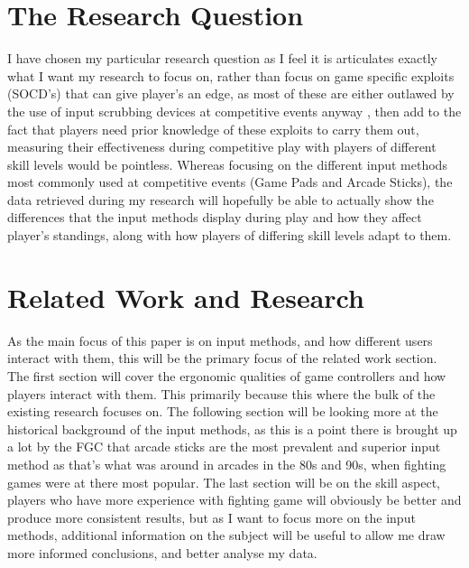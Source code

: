 \documentclass[journal]{IEEEtran}
\begin{document}
\section{The Research Question}
I have chosen my particular research question as I feel it is articulates exactly what I want my research to focus on, rather than focus on game specific exploits (SOCD's) that can give player's an edge, as most of these are either outlawed by the use of input scrubbing devices at competitive events anyway \cite{socdinput}, then add to the fact that players need prior knowledge of these exploits to carry them out, measuring their effectiveness during competitive play with players of different skill levels would be pointless. Whereas focusing on the different input methods most commonly used at competitive events (Game Pads and Arcade Sticks), the data retrieved during my research will hopefully be able to actually show the differences that the input methods display during play and how they affect player's standings, along with how players of differing skill levels adapt to them. 

\section{Related Work and Research}
As the main focus of this paper is on input methods, and how different users interact with them, this will be the primary focus of the related work section. The first section will cover the ergonomic qualities of game controllers and how players interact with them. This primarily because this where the bulk of the existing research focuses on. The following section will be looking more at the historical background of the input methods, as this is a point there is brought up a lot by the FGC that arcade sticks are the most prevalent and superior input method as that's what was around in arcades in the 80s and 90s, when fighting games were at there most popular. The last section will be on the skill aspect, players who have more experience with fighting game will obviously be better and produce more consistent results, but as I want to focus more on the input methods, additional information on the subject will be useful to allow me draw more informed conclusions, and better analyse my data. 
\end{document}
